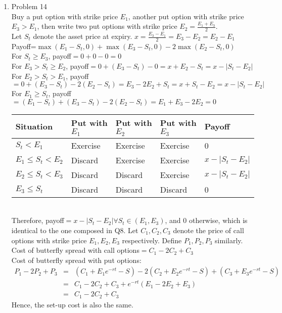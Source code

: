 \documentclass[leqno,12pt]{article}
\begin{document}
\begin{enumerate}
\item Problem 14\\
Buy a put option with strike price $E_1$, another put option with strike price $E_3>E_1$, then write two put options with strike price $E_2=\frac{E_1+E_3}{2}$.\\
Let $S_t$ denote the asset price at expiry. $x=\frac{E_3-E_1}{2}=E_3-E_2=E_2-E_1$\\
Payoff=$\max(E_1-S_t,0)+\max(E_3-S_t,0)-2\max(E_2-S_t,0)$\\
For $S_t\geq E_3$, payoff$=0+0-0=0$\\
For $E_3>S_t\geq E_2$, payoff$=0+(E_3-S_t)-0=x+E_2-S_t=x-|S_t-E_2|$\\
For $E_2>S_t>E_1$, payoff$=0+(E_3-S_t)-2(E_2-S_t)=E_3-2E_2+S_t=x+S_t-E_2=x-|S_t-E_2|$\\
For $E_1\geq S_t$, payoff$=(E_1-S_t)+(E_3-S_t)-2(E_2-S_t)=E_1+E_3-2E_2=0$\\
\begin{table}[ht]
	\centering
    \begin{tabular}{|l|l|l|l|l|}
    \hline
    Situation         & Put with $E_1$ & Put with $E_2$ & Put with $E_3$ & Payoff \\ \hline
    $S_t<E_1$         & Exercise       & Exercise       & Exercise       & 0\\ \hline
    $E_1\leq S_t<E_2$ & Discard        & Exercise       & Exercise       & $x-|S_t-E_2|$\\ \hline
    $E_2\leq S_t<E_3$ & Discard        & Discard        & Exercise       & $x-|S_t-E_2|$\\ \hline
    $E_3\leq S_t$     & Discard        & Discard        & Discard        & 0     \\ \hline
    \end{tabular}
\end{table}\\
Therefore, payoff$=x-|S_t-E_2|\forall S_t\in(E_1,E_3)$, and 0 otherwise, which is identical to the one composed in Q8.
Let $C_1,C_2,C_3$ denote the price of call options with strike price $E_1,E_2,E_3$ respectively. Define $P_1,P_2,P_3$ similarly.\\
Cost of butterfly spread with call options$=C_1-2C_2+C_3$\\
Cost of butterfly spread with put options:
\begin{eqnarray*}
P_1-2P_2+P_3&=&(C_1+E_1e^{-rt}-S)-2(C_2+E_2e^{-rt}-S)+(C_3+E_3e^{-rt}-S)\\
&=&C_1-2C_2+C_3+e^{-rt}(E_1-2E_2+E_3)\\
&=&C_1-2C_2+C_3
\end{eqnarray*}
Hence, the set-up cost is also the same.\\


\end{enumerate}
\end{document}
